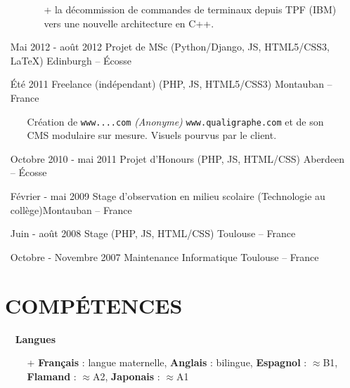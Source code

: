 \documentclass{res}
\begin{document}
\begin{resume}
\begin{itemize}
\begin{itemize}
\begin{itemize}
                \item[+] la d\'ecommission de commandes de terminaux depuis TPF (IBM) vers une nouvelle architecture en C++.
            \end{itemize}
        \end{itemize}
        \item[] Mai 2012 - ao\^ut 2012 \tabto{5cm} Projet de MSc (Python/Django, JS, HTML5/CSS3, \LaTeX{}) \hfill Edinburgh -- \'Ecosse
        \item[] \'Et\'e 2011 \tabto{5cm} Freelance (ind\'ependant) (PHP, JS, HTML5/CSS3) \hfill Montauban -- France
        \begin{itemize}
            \item[] Cr\'eation de \ifisanon \texttt{www....com} \textit{(Anonyme)} \else \texttt{www.qualigraphe.com} \fi et de son CMS modulaire sur mesure. Visuels pourvus par le client.
        \end{itemize}
        \item[] Octobre 2010 - mai 2011 \tabto{5cm} Projet d'Honours (PHP, JS, HTML/CSS) \hfill Aberdeen -- \'Ecosse
        \item[] F\'evrier - mai 2009 \tabto{5cm} Stage d'observation en milieu scolaire (Technologie au coll\`ege)\hfill Montauban -- France
        \item[] Juin - ao\^ut 2008 \tabto{5cm} Stage (PHP, JS, HTML/CSS) \hfill Toulouse -- France
        \item[] Octobre - Novembre 2007 \tabto{5cm} Maintenance Informatique \hfill Toulouse -- France
    \end{itemize}

\pagebreak

\section{\faLayerGroup~COMP\'ETENCES}
    \begin{itemize}
        \item[] \faLanguage~\textbf{Langues}
        \begin{itemize}
            \item[+]  \textbf{Fran\c{c}ais} : langue maternelle, \textbf{Anglais} : bilingue, \textbf{Espagnol} : $\approx$B1, \textbf{Flamand} : $\approx$A2, \textbf{Japonais} : $\approx$A1
        \end{itemize}
    \end{itemize}


\end{resume}
\end{document}
